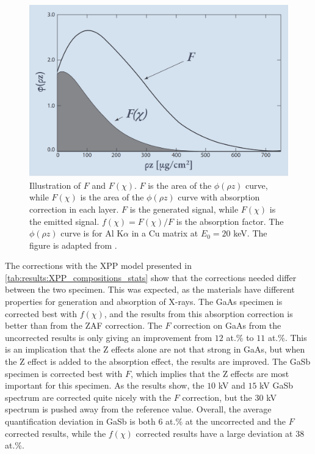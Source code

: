 \begin{figure}[htbp]
    \centering
    \includegraphics[width=0.8\linewidth]{figures/discussion/xpp_absorption_correction.png}
    \caption{
        Illustration of $F$ and $F(\chi)$.
        $F$ is the area of the $\phi(\rho z)$ curve, while $F(\chi)$ is the area of the $\phi(\rho z)$ curve with absorption correction in each layer.
        $F$ is the generated signal, while $F(\chi)$ is the emitted signal.
        $f(\chi) = F(\chi) / F$ is the absorption factor.
        The $\phi(\rho z)$ curve is for Al K$\alpha$ in a Cu matrix at $E_0 = 20$ keV.
        The figure is adapted from \cite[Fig. 19.14]{goldstein_scanning_2018}.
    }
    \label{fig:discussion:pap:F_and_Fchi}
\end{figure}


The corrections with the XPP model presented in \cref{tab:results:XPP_compositions_stats} show that the corrections needed differ between the two specimen.
This was expected, as the materials have different properties for generation and absorption of X-rays.
The GaAs specimen is corrected best with $f(\chi)$, and the results from this absorption correction is better than from the ZAF correction.
The $F$ correction on GaAs from the uncorrected results is only giving an improvement from $12$ at.\% to $11$ at.\%.
This is an implication that the Z effects alone are not that strong in GaAs, but when the Z effect is added to the absorption effect, the results are improved.
The GaSb specimen is corrected best with $F$, which implies that the Z effects are most important for this specimen.
As the results show, the $10$ kV and $15$ kV GaSb spectrum are corrected quite nicely with the $F$ correction, but the $30$ kV spectrum is pushed away from the reference value.
Overall, the average quantification deviation in GaSb is both $6$ at.\% at the uncorrected and the $F$ corrected results, while the $f(\chi)$ corrected results have a large deviation at $38$ at.\%.


